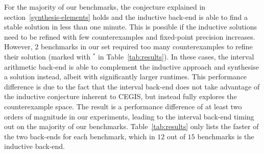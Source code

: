 \documentclass{sig-alternate-05-2015}
\begin{document}
For the majority of our benchmarks, the conjecture explained
in section~\ref{synthesis-elements}  holds and the inductive back-end is able to find a stable
solution in less than one minute.  This is possible if the inductive solutions need to be refined
with few counterexamples and fixed-point precision increases. However, $2$ benchmarks in our set
required too many counterexamples to refine their solution (marked with $^*$ in Table~\ref{tab:results}). 
In these cases, the interval arithmetic back-end is able to complement the inductive approach
and synthesise a solution instead, albeit with significantly larger runtimes.  This performance
difference is due to  the fact that the interval back-end does not take advantage of the inductive
conjecture inherent to CEGIS, but instead fully explores the counterexample space.  The result is
a performance difference of at least two orders of magnitude in our experiments, leading to the
interval back-end timing out on the majority of our benchmarks.  Table~\ref{tab:results} only
lists the faster of the two back-ends for each benchmark, which in $12$ out of $15$ benchmarks is the inductive
back-end.
\end{document}

